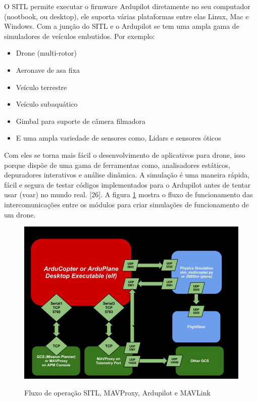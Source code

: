 O SITL permite executar o firmware Ardupilot diretamente no seu computador (nootbook, ou desktop), ele suporta várias plataformas entre elas Linux, Mac e Windows.
Com a junção do SITL e o Ardupilot se tem uma ampla gama de simuladores de veículos embutidos. Por exemplo:
\begin{itemize}
    \item Drone (multi-rotor)
    \item Aeronave de asa fixa
    \item Veículo terrestre
    \item Veículo subaquático
    \item Gimbal para suporte de câmera filmadora
    \item E uma ampla variedade de sensores como, Lidars e sensores óticos
\end{itemize}

Com eles se torna mais fácil o desenvolvimento de aplicativos para drone, isso porque dispõe de uma gama de ferramentas como, analisadores estáticos, depuradores interativos e análise dinâmica. A simulação é uma maneira rápida, fácil e segura de testar códigos implementados para o Ardupilot antes de tentar usar (voar) no mundo real. [26]. A figura \ref{fig:ardupilot} mostra o fluxo de funcionamento das intercomunicações entre os módulos para criar simulações de funcionamento de um drone.

\begin{figure}[htpb]
  \centering
  \caption{Fluxo de operação SITL, MAVProxy, Ardupilot e MAVLink}
  \includegraphics[scale=.5]{figs/ardupilot.jpg}
  \label{fig:ardupilot}
\end{figure}
